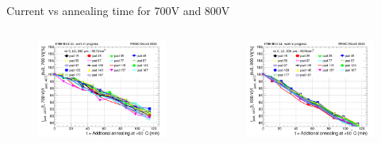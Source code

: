 \documentclass{beamer}
\begin{document}
\begin{frame}{Current vs annealing time for 700V and 800V}
  \begin{columns}
       \begin{figure}
           \includegraphics[width=1.0\textwidth]{plots/8in_198ch_2019_N4790_21_4E15_neg40degC_annealing_current_700.png}
       \end{figure}
       \begin{figure}
           \includegraphics[width=1.0\textwidth]{plots/8in_198ch_2019_N4790_21_4E15_neg40degC_annealing_current_800.png}
       \end{figure}
   \end{columns}
\end{frame}
\end{document}
